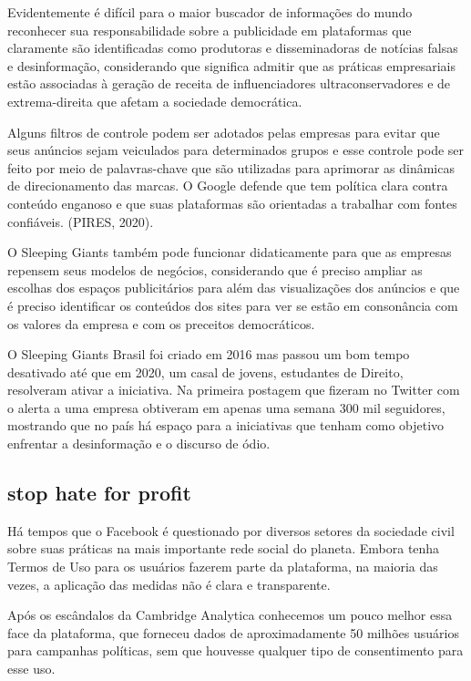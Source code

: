 Evidentemente é difícil para o maior buscador de informações do mundo
reconhecer sua responsabilidade sobre a publicidade em plataformas que
claramente são identificadas como produtoras e disseminadoras de
notícias falsas e desinformação, considerando que significa admitir que
as práticas empresariais estão associadas à geração de receita de
influenciadores ultraconservadores e de extrema-direita que afetam a
sociedade democrática.

Alguns filtros de controle podem ser adotados pelas empresas para evitar
que seus anúncios sejam veiculados para determinados grupos e esse
controle pode ser feito por meio de palavras-chave que são utilizadas
para aprimorar as dinâmicas de direcionamento das marcas. O Google
defende que tem política clara contra conteúdo enganoso e que suas
plataformas são orientadas a trabalhar com fontes confiáveis. (PIRES,
2020).

O Sleeping Giants também pode funcionar didaticamente para que as
empresas repensem seus modelos de negócios, considerando que é preciso
ampliar as escolhas dos espaços publicitários para além das
visualizações dos anúncios e que é preciso identificar os conteúdos dos
sites para ver se estão em consonância com os valores da empresa e com
os preceitos democráticos.

O Sleeping Giants Brasil foi criado em 2016 mas passou um bom tempo
desativado até que em 2020, um casal de jovens, estudantes de Direito,
resolveram ativar a iniciativa. Na primeira postagem que fizeram no
Twitter com o alerta a uma empresa obtiveram em apenas uma semana 300
mil seguidores, mostrando que no país há espaço para a iniciativas que
tenham como objetivo enfrentar a desinformação e o discurso de ódio.

\subsection{stop hate for profit}

Há tempos que o Facebook é questionado por diversos setores da sociedade
civil sobre suas práticas na mais importante rede social do planeta.
Embora tenha Termos de Uso para os usuários fazerem parte da plataforma,
na maioria das vezes, a aplicação das medidas não é clara e
transparente.

Após os escândalos da Cambridge Analytica conhecemos um pouco melhor
essa face da plataforma, que forneceu dados de aproximadamente 50
milhões usuários para campanhas políticas, sem que houvesse qualquer
tipo de consentimento para esse uso.

